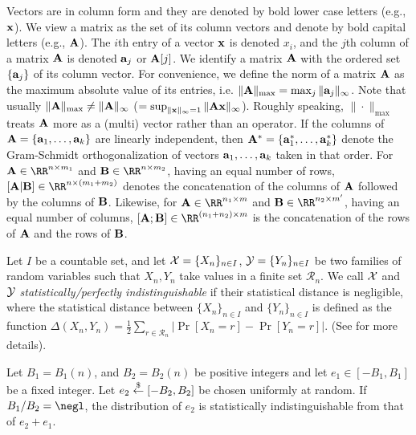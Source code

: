 \documentclass{fundam}
\begin{document}
Vectors are in column form and they are denoted by bold lower case letters (e.g., $\mathbf{x}$). We view a matrix as the set of its column vectors and denote by bold capital letters (e.g., $\mathbf{A}$). The $i$th entry of a vector $\mathbf{x}$ is denoted $x_{i}$, and the $j$th column of a matrix $\mathbf{A}$ is denoted $\mathbf{a}_{j}$ or $\mathbf{A}[j]$. We identify a matrix $\mathbf{A}$ with the ordered set $\{\mathbf{a}_{j}\}$ of its column vector. For convenience, we define the norm of a matrix $\mathbf{A}$ as the maximum absolute value of its entries, i.e. $\|\mathbf{A}\|_{\max} = \max_{j}\|\mathbf{a}_{j}\|_{\infty}$. Note that usually $\|\mathbf{A}\|_{\max} \neq \|\mathbf{A} \|_{\infty} $ ($=\sup_{\|\mathbf{x}\|_{\infty}=1}\|\mathbf{A}\mathbf{x}\|_{\infty}$). Roughly speaking, $\|\cdot \|_{\max}$ treats $\mathbf{A}$ more as a (multi) vector rather than an operator. If the columns of $\mathbf{A} = \{ \mathbf{a}_{1}, \ldots ,  \mathbf{a}_{k} \}$ are linearly independent, then $\mathbf{A}^{*} = \{ \mathbf{a}_{1}^{*}, \ldots ,  \mathbf{a}_{k}^{*} \} $ denote the Gram-Schmidt orthogonalization of vectors $\mathbf{a}_{1}, \ldots ,  \mathbf{a}_{k}$ taken in that order. For $\vr{A}\in\RR^{n\times m_{1}}$ and $\vr{B}\in\RR^{n\times m_{2}}$, having an equal number of rows, $[\vr{A}|\vr{B}]\in\RR^{n\times (m_{1}+m_{2})}$ denotes the concatenation of the columns of $\mathbf{A}$ followed by the columns of $\mathbf{B}$. Likewise, for  $\vr{A}\in\RR^{n_{1}\times m}$ and $\vr{B}\in\RR^{n_{2}\times m'}$, having an equal number of columns, $[\vr{A};\vr{B}]\in\RR^{(n_{1}+n_{2})\times m}$ is the concatenation of the rows of $\mathbf{A}$ and the rows of $\mathbf{B}$.

Let $I$ be a countable set, and let $\mathcal{X}=\{X_{n}\}_{n\in I}$, $\mathcal{Y}=\{Y_{n}\}_{n\in I}$ be two families of random variables such that $X_{n}, Y_{n}$ take values in a finite set $\mathcal{R}_{n}$. We call $\mathcal{X}$ and $\mathcal{Y}$ \textit{statistically/perfectly indistinguishable} if  their statistical distance is negligible, where the statistical distance between $\{X_{n}\}_{n\in I}$ and $\{Y_{n}\}_{n\in I}$ is defined as the function
	$\Delta(X_{n}, Y_{n}) = \frac{1}{2}\sum_{r\in \mathcal{R}_{n}} \left| \Pr[X_{n}=r] - \Pr[Y_{n}=r]  \right|.$
(See \cite{goldreich2001foundations} for more details).

\begin{lemma}\label{lem::smudging}
	Let $B_{1}=B_{1}(n)$, and $B_{2}=B_{2}(n)$ be positive integers and let $e_{1}\in [-B_{1}, B_{1}]$ be a fixed integer. Let $e_{2}\overset{\$}{\gets} [-B_{2}, B_{2}]$ be chosen uniformly at random. If $B_{1}/B_{2}=\negl$, the distribution of $e_{2}$ is statistically indistinguishable from that of $e_{2}+e_{1}$.
\end{lemma}	
\end{document}
